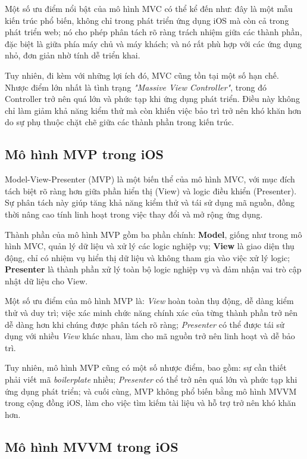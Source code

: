   Một số ưu điểm nổi bật của mô hình MVC có thể kể đến như: đây là một mẫu kiến trúc phổ biến, không chỉ trong phát triển ứng dụng iOS mà còn cả trong phát triển web; nó cho phép phân tách rõ ràng trách nhiệm giữa các thành phần, đặc biệt là giữa phía máy chủ và máy khách; và nó rất phù hợp với các ứng dụng nhỏ, đơn giản nhờ tính dễ triển khai.

  Tuy nhiên, đi kèm với những lợi ích đó, MVC cũng tồn tại một số hạn chế. Nhược điểm lớn nhất là tình trạng \textit{"Massive View Controller"}, trong đó Controller trở nên quá lớn và phức tạp khi ứng dụng phát triển. Điều này không chỉ làm giảm khả năng kiểm thử mà còn khiến việc bảo trì trở nên khó khăn hơn do sự phụ thuộc chặt chẽ giữa các thành phần trong kiến trúc.

\subsection{Mô hình MVP trong iOS}

\hspace*{0.8cm}Model-View-Presenter (MVP) là một biến thể của mô hình MVC, với mục đích tách biệt rõ ràng hơn giữa phần hiển thị (View) và logic điều khiển (Presenter). Sự phân tách này giúp tăng khả năng kiểm thử và tái sử dụng mã nguồn, đồng thời nâng cao tính linh hoạt trong việc thay đổi và mở rộng ứng dụng. 

  Thành phần của mô hình MVP gồm ba phần chính: \textbf{Model}, giống như trong mô hình MVC, quản lý dữ liệu và xử lý các logic nghiệp vụ; \textbf{View} là giao diện thụ động, chỉ có nhiệm vụ hiển thị dữ liệu và không tham gia vào việc xử lý logic; \textbf{Presenter} là thành phần xử lý toàn bộ logic nghiệp vụ và đảm nhận vai trò cập nhật dữ liệu cho View.

  Một số ưu điểm của mô hình MVP là: \textit{View} hoàn toàn thụ động, dễ dàng kiểm thử và duy trì; việc xác minh chức năng chính xác của từng thành phần trở nên dễ dàng hơn khi chúng được phân tách rõ ràng; \textit{Presenter} có thể được tái sử dụng với nhiều \textit{View} khác nhau, làm cho mã nguồn trở nên linh hoạt và dễ bảo trì.

  Tuy nhiên, mô hình MVP cũng có một số nhược điểm, bao gồm: sự cần thiết phải viết mã \textit{boilerplate} nhiều; \textit{Presenter} có thể trở nên quá lớn và phức tạp khi ứng dụng phát triển; và cuối cùng, MVP không phổ biến bằng mô hình MVVM trong cộng đồng iOS, làm cho việc tìm kiếm tài liệu và hỗ trợ trở nên khó khăn hơn.

\subsection{Mô hình MVVM trong iOS}

